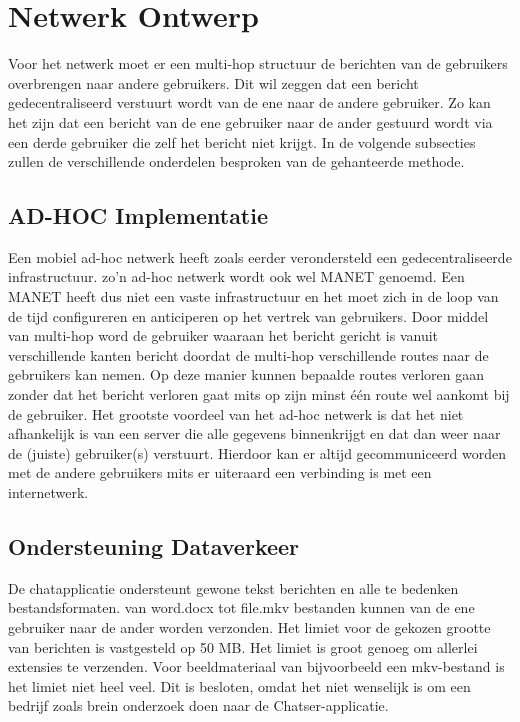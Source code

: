 \documentclass[12pt]{article}
\begin{document}
\section{Netwerk Ontwerp}
Voor het netwerk moet er een multi-hop structuur de berichten van de gebruikers overbrengen naar andere gebruikers. Dit wil zeggen dat een bericht gedecentraliseerd verstuurt wordt van de ene naar de andere gebruiker. Zo kan het zijn dat een bericht van de ene gebruiker naar de ander gestuurd wordt via een derde gebruiker die zelf het bericht niet krijgt. In de volgende subsecties zullen de verschillende onderdelen besproken van de gehanteerde methode. 

\subsection{AD-HOC Implementatie}
Een mobiel ad-hoc netwerk heeft zoals eerder verondersteld een gedecentraliseerde infrastructuur. zo'n ad-hoc netwerk wordt ook wel MANET genoemd. Een MANET heeft dus niet een vaste infrastructuur en het moet zich in de loop van de tijd configureren en anticiperen op het vertrek van gebruikers. Door middel van multi-hop  word de gebruiker waaraan het bericht gericht is vanuit verschillende kanten bericht doordat de multi-hop verschillende routes naar de gebruikers kan nemen. Op deze manier kunnen bepaalde routes verloren gaan zonder dat het bericht verloren gaat mits op zijn minst \'e\'en route wel aankomt bij de gebruiker. Het grootste voordeel van het ad-hoc netwerk is dat het niet afhankelijk is van een server die alle gegevens binnenkrijgt en dat dan weer naar de (juiste) gebruiker(s) verstuurt. Hierdoor kan er altijd gecommuniceerd worden met de andere gebruikers mits er uiteraard een verbinding is met een internetwerk.

\subsection{Ondersteuning Dataverkeer}
De chatapplicatie ondersteunt gewone tekst berichten en alle te bedenken bestandsformaten. van word.docx tot file.mkv bestanden kunnen van de ene gebruiker naar de ander worden verzonden. Het limiet voor de gekozen grootte van berichten is vastgesteld op 50 MB. Het limiet is groot genoeg om allerlei extensies te verzenden. Voor beeldmateriaal van bijvoorbeeld een mkv-bestand is het limiet niet heel veel. Dit is besloten, omdat het niet wenselijk is om een bedrijf zoals brein onderzoek doen naar de Chatser-applicatie\small\textcopyright.
\end{document}

